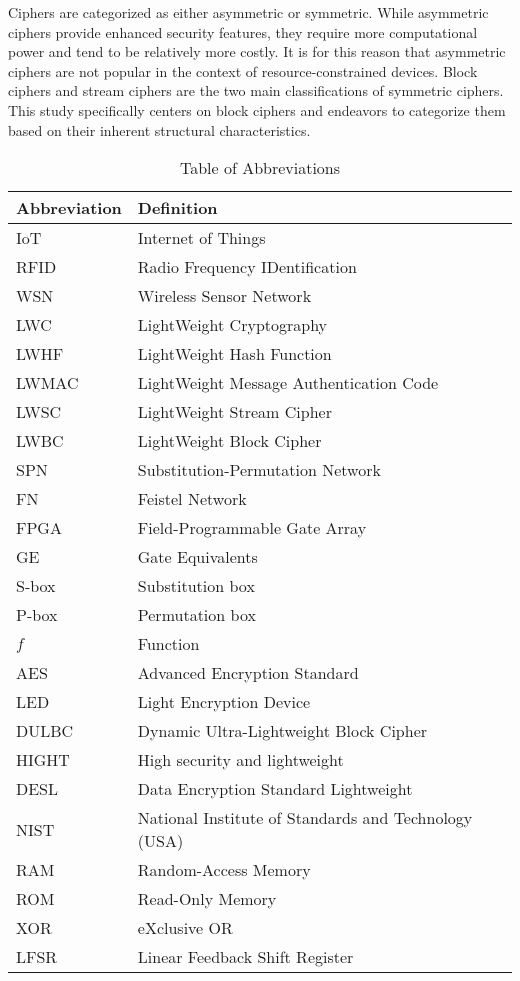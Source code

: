 \documentclass[conference,compsoc]{IEEEtran}
\begin{document}
Ciphers are categorized as either asymmetric or symmetric. While asymmetric ciphers provide enhanced security features, they require more computational power and tend to be relatively more costly. It is for this reason that asymmetric ciphers are not popular in the context of resource-constrained devices. Block ciphers and stream ciphers are the two main classifications of symmetric ciphers. This study specifically centers on block ciphers and endeavors to categorize them based on their inherent structural characteristics. 

\begin{table}[ht]
    \centering
    \caption{Table of Abbreviations}
    \begin{tabular}{ll}
        \toprule
        \textbf{Abbreviation} & \textbf{Definition} \\
        \midrule
        IoT & Internet of Things \\
        RFID & Radio Frequency IDentification \\
        WSN & Wireless Sensor Network \\
        LWC & LightWeight Cryptography \\
        LWHF & LightWeight Hash Function \\
        LWMAC & LightWeight Message Authentication Code \\
        LWSC & LightWeight Stream Cipher \\
        LWBC & LightWeight Block Cipher \\
        SPN & Substitution-Permutation Network \\
        FN & Feistel Network \\
        FPGA & Field-Programmable Gate Array \\
        GE & Gate Equivalents \\
        S-box & Substitution box \\
        P-box & Permutation box \\
        $f$ & Function \\
        AES & Advanced Encryption Standard \\
        LED & Light Encryption Device \\
        DULBC & Dynamic Ultra-Lightweight Block Cipher \\
        HIGHT & High security and lightweight \\
        DESL & Data Encryption Standard Lightweight \\
        NIST & National Institute of Standards and Technology (USA) \\
        RAM & Random-Access Memory \\
        ROM & Read-Only Memory \\
        XOR & eXclusive OR \\
        LFSR & Linear Feedback Shift Register \\
        \bottomrule
    \end{tabular}
    \label{table:abbreviations}
\end{table}
\end{document}
